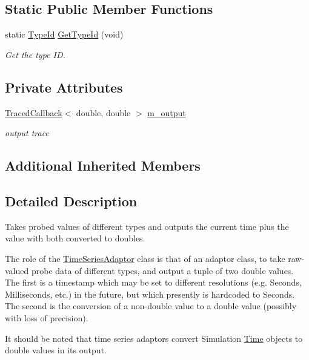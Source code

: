 \subsection*{Static Public Member Functions}
\begin{DoxyCompactItemize}
\item 
static \hyperlink{classns3_1_1TypeId}{Type\+Id} \hyperlink{classns3_1_1TimeSeriesAdaptor_a22a665f697380cec348b623eaea11552}{Get\+Type\+Id} (void)
\begin{DoxyCompactList}\small\item\em Get the type ID. \end{DoxyCompactList}\end{DoxyCompactItemize}
\subsection*{Private Attributes}
\begin{DoxyCompactItemize}
\item 
\hyperlink{classns3_1_1TracedCallback}{Traced\+Callback}$<$ double, double $>$ \hyperlink{classns3_1_1TimeSeriesAdaptor_a83bca39fca2550dcd342f8510161267e}{m\+\_\+output}
\begin{DoxyCompactList}\small\item\em output trace \end{DoxyCompactList}\end{DoxyCompactItemize}
\subsection*{Additional Inherited Members}


\subsection{Detailed Description}
Takes probed values of different types and outputs the current time plus the value with both converted to doubles. 

The role of the \hyperlink{classns3_1_1TimeSeriesAdaptor}{Time\+Series\+Adaptor} class is that of an adaptor class, to take raw-\/valued probe data of different types, and output a tuple of two double values. The first is a timestamp which may be set to different resolutions (e.\+g. Seconds, Milliseconds, etc.) in the future, but which presently is hardcoded to Seconds. The second is the conversion of a non-\/double value to a double value (possibly with loss of precision).

It should be noted that time series adaptors convert Simulation \hyperlink{classns3_1_1Time}{Time} objects to double values in its output. 

